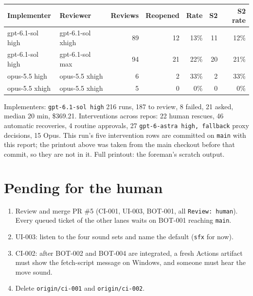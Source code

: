 \documentclass[11pt,a4paper]{article}
\begin{document}
{\small
\begin{tabular}{@{}llrrrrr@{}}
\toprule
Implementer & Reviewer & Reviews & Reopened & Rate & S2 & S2 rate \\
\midrule
gpt-6.1-sol high & gpt-6.1-sol xhigh & 89 & 12 & 13\% & 11 & 12\% \\
gpt-6.1-sol high & gpt-6.1-sol max & 94 & 21 & 22\% & 20 & 21\% \\
opus-5.5 high & opus-5.5 xhigh & 6 & 2 & 33\% & 2 & 33\% \\
opus-5.5 xhigh & opus-5.5 xhigh & 5 & 0 & 0\% & 0 & 0\% \\
\bottomrule
\end{tabular}
}

\medskip
Implementers: \texttt{gpt-6.1-sol high} 216 runs, 187 to review, 8 failed, 21 asked, median
20 min, \$369.21. Interventions across repos: 22 human rescues, 46 automatic recoveries, 4
routine approvals, 27 \texttt{gpt-6-astra high, fallback} proxy decisions, 15 Opus. This
run's five intervention rows are committed on \texttt{main} with this report; the printout
above was taken from the main checkout before that commit, so they are not in it. Full
printout: the foreman's scratch output.

\section*{Pending for the human}

\begin{enumerate}
  \item Review and merge PR \#5 (CI-001, UI-003, BOT-001, all \texttt{Review: human}). Every
        queued ticket of the other lanes waits on BOT-001 reaching \texttt{main}.
  \item UI-003: listen to the four sound sets and name the default (\texttt{sfx} for now).
  \item CI-002: after BOT-002 and BOT-004 are integrated, a fresh Actions artifact must show
        the fetch-script message on Windows, and someone must hear the move sound.
  \item Delete \texttt{origin/ci-001} and \texttt{origin/ci-002}.
\end{enumerate}
\end{document}
